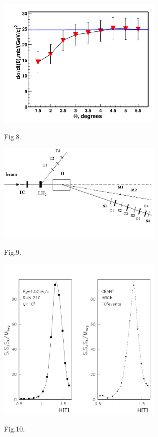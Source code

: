 \documentclass[a4paper,12pt]{article}
\begin{document}
    \begin{figure}[hbt]
      \begin{center}
        \includegraphics[width=8cm]{sigma0.pdf}
      \end{center}
      \vspace{0,4mm}
      Fig.8.
    \end{figure}

    \begin{figure}[hbt]
      \begin{center}
        \includegraphics[width=8cm]{image2.pdf}
      \end{center}
      \vspace{0,4mm}
      Fig.9.
    \end{figure}


    \begin{figure}[hbt]
      \begin{center}
        \includegraphics[width=8cm]{s3ok.pdf}
      \end{center}
      \vspace{0,4mm}
      Fig.10.
    \end{figure}
\end{document}

